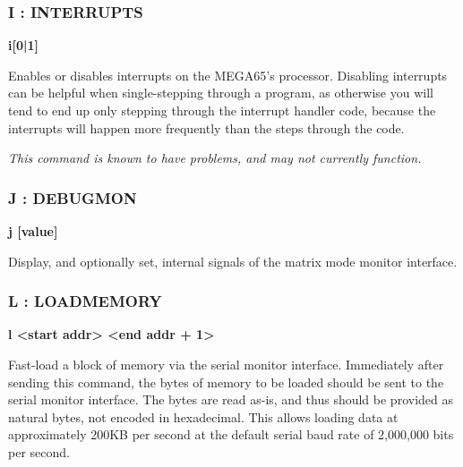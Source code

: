 \subsubsection{I : INTERRUPTS}
\begin{description}[leftmargin=2cm,style=nextline]
\item [Format:] {\bf i[0|1]}
\item [Usage:] Enables or disables interrupts on the MEGA65's
  processor. Disabling interrupts can be helpful when single-stepping
  through a program, as otherwise you will tend to end up only
  stepping through the interrupt handler code, because the interrupts
  will happen more frequently than the steps through the code.

\item [Remarks:] {\em This command is known to have problems, and may
  not currently function.}

\end{description}

\subsubsection{J : DEBUGMON}
\begin{description}[leftmargin=2cm,style=nextline]
\item [Format:] {\bf j [value]}
\item [Usage:] Display, and optionally set, internal signals of the matrix
  mode monitor interface.

\end{description}


\subsubsection{L : LOADMEMORY}
\begin{description}[leftmargin=2cm,style=nextline]
\item [Format:] {\bf l <start addr> <end addr + 1>}
\item [Usage:] Fast-load a block of memory via the serial monitor
  interface.  Immediately after sending this command, the bytes of
  memory to be loaded should be sent to the serial monitor interface.
  The bytes are read as-is, and thus should be provided as natural
  bytes, not encoded in hexadecimal.  This allows loading data at
  approximately 200KB per second at the default serial baud rate
  of 2,000,000 bits per second.

\end{description}

